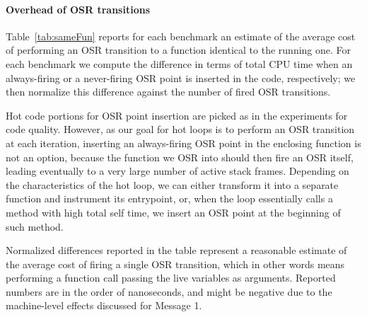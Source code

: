 \paragraph{Overhead of OSR transitions}

Table~\ref{tab:sameFun} reports for each benchmark an estimate of the average cost of performing an OSR transition to a function identical to the running one. For each benchmark we compute the difference in terms of total CPU time when an always-firing or a never-firing OSR point is inserted in the code, respectively; we then normalize this difference against the number of fired OSR transitions.

Hot code portions for OSR point insertion are picked as in the experiments for code quality. However, as our goal for hot loops is to perform an OSR transition at each iteration, inserting an always-firing OSR point in the enclosing function is not an option, because the function we OSR into should then fire an OSR itself, leading eventually to a very large number of active stack frames. Depending on the characteristics of the hot loop, we can either transform it into a separate function and instrument its entrypoint, or, when the loop essentially calls a method with high total self time, we insert an OSR point at the beginning of such method.

Normalized differences reported in the table represent a reasonable estimate of the average cost of firing a single OSR transition, which in other words means performing a function call passing the live variables as arguments. Reported numbers are in the order of nanoseconds, and might be negative due to the machine-level effects discussed for Message 1.

